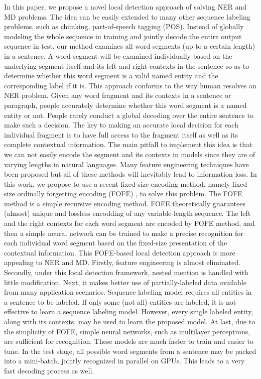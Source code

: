 \documentclass[11pt,a4paper]{article}
\begin{document}
In this paper, we propose a novel local detection approach of solving NER and MD problems. The idea can be easily extended to many other sequence labeling problems, such as chunking, part-of-speech tagging (POS). Instead of globally modeling the whole sequence in training and jointly decode the entire output sequence in test, 
our method examines all word segments (up to a certain length) in a sentence. A word segment will be examined individually based on the underlying segment itself and its left and right contexts in the sentence so as to determine whether this word segment is a valid named entity and the corresponding label if it is. 
This approach conforms to the way human resolves an NER problem. Given any word fragment and its contexts in a sentence or paragraph, people accurately determine whether this word segment is a named entity or not. People rarely conduct a global decoding over the entire sentence to make such a decision. 
The key to making an accurate local decision for each individual fragment is to have full access to the fragment itself as well as its complete contextual information. 
The main pitfall to implement this idea is that we can not easily encode the segment and its contexts in models since they are of varying lengths in natural languages. Many feature engineering techniques have been proposed but all of these methods will inevitably lead to information loss. 
In this work, we propose to use a recent fixed-size encoding method, namely fixed-size ordinally forgetting encoding (FOFE) \cite{zhang2015fixed}, to solve this problem.  The FOFE method is a simple recursive encoding method. FOFE theoretically guarantees (almost) unique and lossless encodding of any variable-length sequence. The left and the right contexts for each word segment are encoded by FOFE method, and then a simple neural network can be trained to make a precise recognition for each individual word segment based on the fixed-size presentation of the contextual information. This FOFE-based local detection approach is more appealing to NER and MD. Firstly, feature engineering is almost eliminated. 
Secondly, under this local detection framework, nested mention is handled with little modification. Next, it makes better use of partially-labeled data available from many application scenarios. Sequence labeling model requires all entities in a sentence to be labeled. If only some (not all) entities are labeled, it is not effective to learn a sequence labeling model. However, every single labeled entity, along with its contexts, may be used to learn the proposed model. At last, due to the simplicity of FOFE, simple neural networks, such as multilayer perceptrons, are sufficient for recognition. These models are much faster to train and easier to tune. In the test stage, all possible word segments from a sentence may be packed into a mini-batch, jointly recognized in parallel on GPUs. This leads to a very fast decoding process as well.
\end{document}
